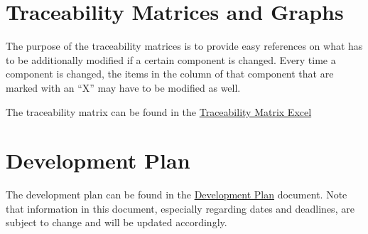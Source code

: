 \documentclass[12pt]{article}
\begin{document}
\newpage

\section{Traceability Matrices and Graphs}

The purpose of the traceability matrices is to provide easy references on what
has to be additionally modified if a certain component is changed.  Every time a
component is changed, the items in the column of that component that are marked
with an ``X'' may have to be modified as well. 

\noindent The traceability matrix can be found in the \href{https://github.com/PlutosCapstone/Plutos/blob/main/docs/SRS/traceability_matrix.xlsx}{Traceability Matrix Excel}

\newpage

\section{Development Plan}

The development plan can be found in the
\href{https://github.com/PlutosCapstone/Plutos/blob/main/docs/DevelopmentPlan/DevelopmentPlan.pdf}{Development
Plan} document. Note that information in this document, especially regarding dates and deadlines, are subject to change and will be updated accordingly. \\
\end{document}
